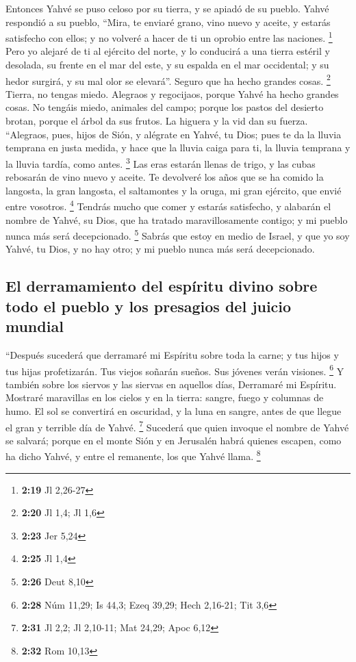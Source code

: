 \begin{paracol}{2}
 Entonces Yahvé se puso celoso por su tierra, y se apiadó
de su pueblo.  Yahvé respondió a su pueblo, ``Mira, te
enviaré grano, vino nuevo y aceite, y estarás satisfecho con ellos; y no
volveré a hacer de ti un oprobio entre las naciones. \footnote{\textbf{2:19}
  Jl 2,26-27}  Pero yo alejaré de ti al ejército del
norte, y lo conducirá a una tierra estéril y desolada, su frente en el
mar del este, y su espalda en el mar occidental; y su hedor surgirá, y
su mal olor se elevará''. Seguro que ha hecho grandes cosas. \footnote{\textbf{2:20}
  Jl 1,4; Jl 1,6}  Tierra, no tengas miedo. Alegraos y
regocijaos, porque Yahvé ha hecho grandes cosas.  No
tengáis miedo, animales del campo; porque los pastos del desierto
brotan, porque el árbol da sus frutos. La higuera y la vid dan su
fuerza.  ``Alegraos, pues, hijos de Sión, y alégrate en
Yahvé, tu Dios; pues te da la lluvia temprana en justa medida, y hace
que la lluvia caiga para ti, la lluvia temprana y la lluvia tardía, como
antes. \footnote{\textbf{2:23} Jer 5,24}  Las eras
estarán llenas de trigo, y las cubas rebosarán de vino nuevo y aceite.
 Te devolveré los años que se ha comido la langosta, la
gran langosta, el saltamontes y la oruga, mi gran ejército, que envié
entre vosotros. \footnote{\textbf{2:25} Jl 1,4}  Tendrás
mucho que comer y estarás satisfecho, y alabarán el nombre de Yahvé, su
Dios, que ha tratado maravillosamente contigo; y mi pueblo nunca más
será decepcionado. \footnote{\textbf{2:26} Deut 8,10} 
Sabrás que estoy en medio de Israel, y que yo soy Yahvé, tu Dios, y no
hay otro; y mi pueblo nunca más será decepcionado.

\hypertarget{el-derramamiento-del-espuxedritu-divino-sobre-todo-el-pueblo-y-los-presagios-del-juicio-mundial}{%
\subsection{El derramamiento del espíritu divino sobre todo el pueblo y
los presagios del juicio
mundial}\label{el-derramamiento-del-espuxedritu-divino-sobre-todo-el-pueblo-y-los-presagios-del-juicio-mundial}}

 ``Después sucederá que derramaré mi Espíritu sobre toda
la carne; y tus hijos y tus hijas profetizarán. Tus viejos soñarán
sueños. Sus jóvenes verán visiones. \footnote{\textbf{2:28} Núm 11,29;
  Is 44,3; Ezeq 39,29; Hech 2,16-21; Tit 3,6}  Y también
sobre los siervos y las siervas en aquellos días, Derramaré mi Espíritu.
 Mostraré maravillas en los cielos y en la tierra:
sangre, fuego y columnas de humo.  El sol se convertirá
en oscuridad, y la luna en sangre, antes de que llegue el gran y
terrible día de Yahvé. \footnote{\textbf{2:31} Jl 2,2; Jl 2,10-11; Mat
  24,29; Apoc 6,12}  Sucederá que quien invoque el nombre
de Yahvé se salvará; porque en el monte Sión y en Jerusalén habrá
quienes escapen, como ha dicho Yahvé, y entre el remanente, los que
Yahvé llama. \footnote{\textbf{2:32} Rom 10,13}


\end{paracol}
